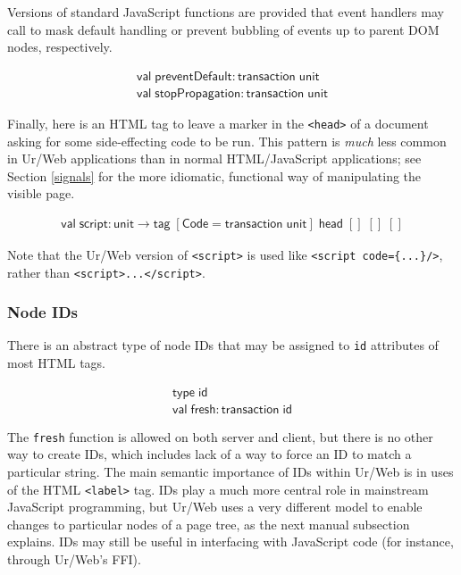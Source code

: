 \documentclass{article}
\newcommand{\cd}[1]{\texttt{#1}}
\newcommand{\mt}[1]{\mathsf{#1}}
\begin{document}
Versions of standard JavaScript functions are provided that event handlers may call to mask default handling or prevent bubbling of events up to parent DOM nodes, respectively.

$$\begin{array}{l}
  \mt{val} \; \mt{preventDefault} : \mt{transaction} \; \mt{unit} \\
  \mt{val} \; \mt{stopPropagation} : \mt{transaction} \; \mt{unit}
\end{array}$$

Finally, here is an HTML tag to leave a marker in the \cd{<head>} of a document asking for some side-effecting code to be run.  This pattern is \emph{much} less common in Ur/Web applications than in normal HTML/JavaScript applications; see Section \ref{signals} for the more idiomatic, functional way of manipulating the visible page.

$$\begin{array}{l}
  \mt{val} \; \mt{script} : \mt{unit} \to \mt{tag} \; [\mt{Code} = \mt{transaction} \; \mt{unit}] \; \mt{head} \; [] \; [] \; []
\end{array}$$

Note that the Ur/Web version of \cd{<script>} is used like \cd{<script code=\{...\}/>}, rather than \cd{<script>...</script>}.

\subsubsection{Node IDs}

There is an abstract type of node IDs that may be assigned to \cd{id} attributes of most HTML tags.

$$\begin{array}{l}
  \mt{type} \; \mt{id} \\
  \mt{val} \; \mt{fresh} : \mt{transaction} \; \mt{id}
\end{array}$$

The \cd{fresh} function is allowed on both server and client, but there is no other way to create IDs, which includes lack of a way to force an ID to match a particular string.  The main semantic importance of IDs within Ur/Web is in uses of the HTML \cd{<label>} tag.  IDs play a much more central role in mainstream JavaScript programming, but Ur/Web uses a very different model to enable changes to particular nodes of a page tree, as the next manual subsection explains.  IDs may still be useful in interfacing with JavaScript code (for instance, through Ur/Web's FFI).
\end{document}
